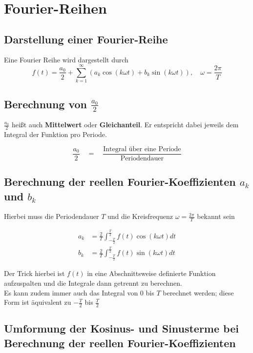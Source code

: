 \documentclass[12pt, a4paper]{scrreprt}
\begin{document}
\clearpage

\setcounter{chapter}{15}

\chapter{Fourier-Reihen}

\section{Darstellung einer Fourier-Reihe}
Eine Fourier Reihe wird dargestellt durch
\[
  f(t) = \frac{a_0}{2} + \sum_{k=1}^{\infty}(a_k \cos (k \omega t) + b_k \sin (k \omega t)), \quad \omega = \frac{2 \pi}{T}
\]

\section{Berechnung von \(\frac{a_0}{2}\)}

\(\frac{a_0}{2}\) heißt auch \textbf{Mittelwert} oder \textbf{Gleichanteil}. Er entspricht dabei jeweils dem Integral der Funktion pro Periode.

\[
  \frac{a_0}{2} \quad = \quad \frac{\text{Integral über eine Periode}}{\text{Periodendauer}}
\]

\section{Berechnung der reellen Fourier-Koeffizienten \(a_k\) und \(b_k\)}

Hierbei muss die Periodendauer \(T\) und die Kreisfrequenz \(\omega = \frac{2\pi}{T}\) bekannt sein

\begin{align*}
  a_k &= \frac{2}{T} \int_{-\frac{T}{2}}^{\frac{T}{2}}f(t) \cos (k \omega t) dt\\[10pt]
  b_k &= \frac{2}{T} \int_{-\frac{T}{2}}^{\frac{T}{2}}f(t) \sin (k \omega t) dt
\end{align*}

Der Trick hierbei ist \(f(t)\) in eine Abschnittsweise definierte Funktion aufzuspalten und die Integrale dann getrennt zu berechnen.\\
Es kann zudem immer auch das Integral von \(0\) bis \(T\) berechnet werden; diese Form ist äquivalent zu \(-\frac{T}{2}\) bis \(\frac{T}{2}\)

\section{Umformung der Kosinus- und Sinusterme bei Berechnung der reellen Fourier-Koeffizienten}
\end{document}
